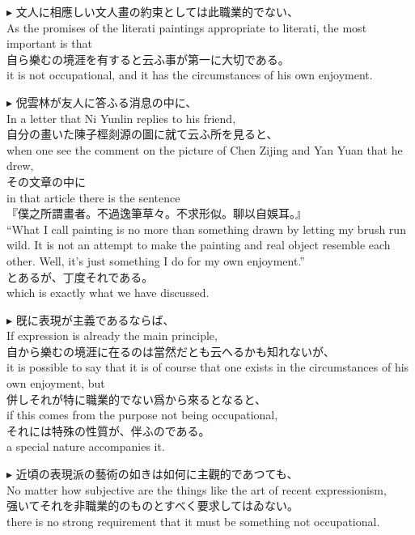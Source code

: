 \documentclass{ctexart}
\makeatletter
\newcommand*{\shifttext}[1]{%
  \settowidth{\@tempdima}{#1}%
  \hspace{-\@tempdima}#1%
}
\newcommand{\plabel}[1]{%
\shifttext{\textbf{#1}\quad}%
}
\makeatother
\begin{document}
\vspace{1em}
\plabel{$\blacktriangleright$}%
文人に相應しい文人畫の約束としては此職業的でない、\\
As the promises of the literati paintings appropriate to literati, the most important is that\\
自ら樂むの境涯を有すると云ふ事が第一に大切である。\\
it is not occupational, and it has the circumstances of his own enjoyment.

\vspace{1em}
\plabel{$\blacktriangleright$}%
倪雲林が友人に答ふる消息の中に、\\
In a letter that Ni Yunlin replies to his friend,\\
自分の畫いた陳子桱剡源の圖に就て云ふ所を見ると、\\
when one see the comment on the picture of Chen Zijing and Yan Yuan that he drew,\\
その文章の中に\\
in that article there is the sentence\\
『僕之所謂畫者。不過逸筆草々。不求形似。聊以自娛耳。』\\
``What I call painting is no more than something drawn by letting my brush run wild.
It is not an attempt to make the painting and real object resemble each other.
Well, it's just something I do for my own enjoyment.''\\
とあるが、丁度それである。\\
which is exactly what we have discussed.

\vspace{1em}
\plabel{$\blacktriangleright$}%
旣に表現が主義であるならば、\\
If expression is already the main principle,\\
自から樂むの境涯に在るのは當然だとも云へるかも知れないが、\\
it is possible to say that it is of course that one exists in the circumstances of his own enjoyment, but\\
併しそれが特に職業的でない爲から來るとなると、\\
if this comes from the purpose not being occupational,\\
それには特殊の性質が、伴ふのである。\\
a special nature accompanies it.

\vspace{1em}
\plabel{$\blacktriangleright$}%
近頃の表現派の藝術の如きは如何に主觀的であつても、\\
No matter how subjective are the things like the art of recent expressionism,\\
强いてそれを非職業的のものとすべく要求してはゐない。\\
there is no strong requirement that it must be something not occupational.
\end{document}
